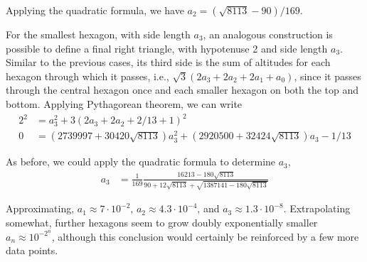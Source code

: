 \documentclass[reqno]{amsart}
\begin{document}
Applying the quadratic formula, we have $a_2 = (\sqrt{8113}-90)/169$. 

For the smallest hexagon, with side length $a_3$, an analogous construction is possible to define a final right triangle, with hypotenuse 2 and side length $a_3$. Similar to the previous cases, its third side is the sum of altitudes for each hexagon through which it passes, i.e., $\sqrt{3}(2a_3+2a_2+2a_1+a_0)$, since it passes through the central hexagon once and each smaller hexagon on both the top and bottom. Applying Pythagorean theorem, we can write 
\begin{align*}
2^2 &= a_3^2 + 3(2a_3 + 2a_2 + 2/13+1)^2 \\
0 &= (2739997+30420\sqrt{8113})a_3^2 + (2920500+32424\sqrt{8113})a_3-1/13
\end{align*}

As before, we could apply the quadratic formula to determine $a_3$, 
\begin{align*}
a_3 &= \frac{1}{169}\frac{16213-180\sqrt{8113}}{90+12\sqrt{8113}+\sqrt{1387141-180\sqrt{8113}}}
\end{align*}

Approximating, $a_1 \approx 7\cdot 10^{-2}$, $a_2 \approx 4.3 \cdot 10^{-4}$, and $a_3 \approx 1.3 \cdot 10^{-8}$. Extrapolating somewhat, further hexagons seem to grow doubly exponentially smaller $a_n \approx 10^{-2^n}$, although this conclusion would certainly be reinforced by a few more data points. 
\end{document}
